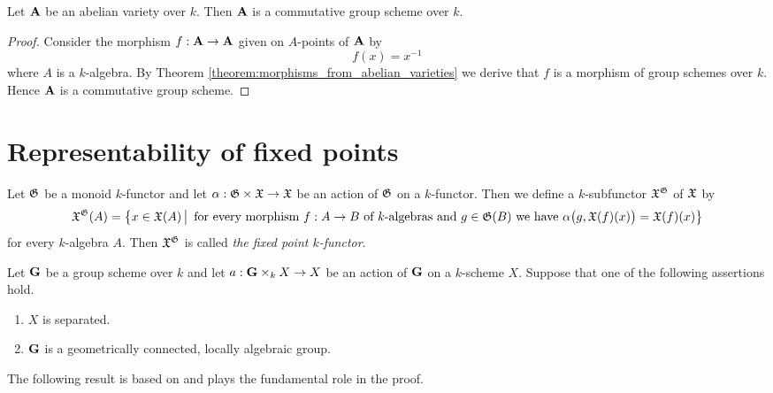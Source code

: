 \begin{corollary}\label{corollary:abelian_varieties_are_commutative}
Let $\mathbf{A}$ be an abelian variety over $k$. Then $\mathbf{A}$ is a commutative group scheme over $k$.
\end{corollary}
\begin{proof}
Consider the morphism $f:\mathbf{A}\rightarrow \mathbf{A}$ given on $A$-points of $\mathbf{A}$ by
$$f(x) = x^{-1}$$
where $A$ is a $k$-algebra. By Theorem \ref{theorem:morphisms_from_abelian_varieties} we derive that $f$ is a morphism of group schemes over $k$. Hence $\mathbf{A}$ is a commutative group scheme.
\end{proof}

\section{Representability of fixed points}

\begin{definition}
Let ${\mathfrak G}$ be a monoid $k$-functor and let $\alpha:{\mathfrak G}\times {\mathfrak X}\rightarrow {\mathfrak X}$ be an action of ${\mathfrak G}$ on a $k$-functor. Then we define a $k$-subfunctor ${\mathfrak X}^{{\mathfrak G}}$ of ${\mathfrak X}$ by
$${\mathfrak X}^{{\mathfrak G}}(A) = \big\{x\in {\mathfrak X}(A)\,\big|\,\mbox{ for every morphism }f:A\rightarrow B\mbox{ of }k\mbox{-algebras and }g\in {\mathfrak G}(B)\mbox{ we have }\alpha\big(g,{\mathfrak X}(f)(x)\big) = {\mathfrak X}(f)(x)\big\}$$
for every $k$-algebra $A$. Then ${\mathfrak X}^{{\mathfrak G}}$ is called \textit{the fixed point $k$-functor}.
\end{definition}

\begin{theorem}\label{theorem:fixed_points_existence}
Let $\mathbf{G}$ be a group scheme over $k$ and let $a:\mathbf{G}\times_kX\rightarrow X$ be an action of $\mathbf{G}$ on a $k$-scheme $X$. Suppose that one of the following assertions hold.
\begin{enumerate}[label=\emph{\textbf{(\roman*)}}, leftmargin=3.0em]
\item $X$ is separated.
\item $\mathbf{G}$ is a geometrically connected, locally algebraic group.
\end{enumerate}
\end{theorem}
\noindent
The following result is based on {\cite[Theorem 7.2]{kfunctors}} and plays the fundamental role in the proof.

